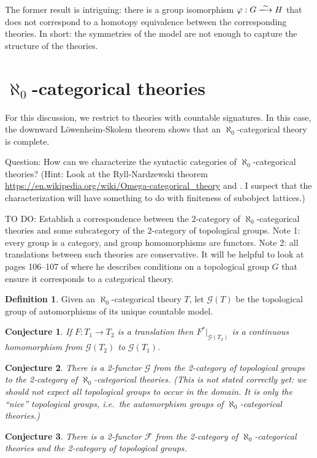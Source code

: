 \documentclass[12pt]{article}
\newtheorem*{conj}{Conjecture}
\theoremstyle{definition}
\newtheorem*{defn}{Definition}
\newcommand{\3}{\mathcal}
\begin{document}
The former result is intriguing: there is a group isomorphism
$\varphi :G\xlongrightarrow{\sim} H$ that does not correspond to a
homotopy equivalence between the corresponding theories. In short: the
symmetries of the model are not enough to capture the structure of the
theories.

\section{$\aleph _0$-categorical theories}

For this discussion, we restrict to theories with countable
signatures. In this case, the downward L{\"o}wenheim-Skolem theorem
shows that an $\aleph _0$-categorical theory is complete.

Question: How can we characterize the syntactic categories of
$\aleph _0$-categorical theories? (Hint: Look at the Ryll-Nardzewski
theorem \url{https://en.wikipedia.org/wiki/Omega-categorical_theory}
and \citep[p 30]{cameron1990}. I suspect that the characterization
will have something to do with finiteness of subobject lattices.)

TO DO: Establish a correspondence between the $2$-category of
$\aleph _0$-categorical theories and some subcategory of the
$2$-category of topological groups. Note 1: every group is a category,
and group homomorphisms are functors.  Note 2: all translations
between such theories are conservative. It will be helpful to look at
pages 106--107 of \citep{cameron1990} where he describes conditions on
a topological group $G$ that ensure it corresponds to a categorical
theory.



\begin{defn} Given an $\aleph _0$-categorical theory $T$, let
  $\3G (T)$ be the topological group of automorphisms of its unique
  countable model. \end{defn}

\begin{conj} If $F:T_1\to T_2$ is a translation then
  $F^*|_{\3G (T_2)}$ is a continuous homomorphism from $\3G (T_2 )$ to
  $\3G (T_1)$. \end{conj}

\begin{conj} There is a 2-functor $\3G$ from the 2-category of
  topological groups to the 2-category of $\aleph _0$-categorical
  theories. (This is not stated correctly yet: we should not expect
  all topological groups to occur in the domain. It is only the
  ``nice'' topological groups, i.e.\ the automorphism groups of
  $\aleph _0$-categorical theories.) \end{conj}


\begin{conj} There is a 2-functor $\3F$ from the 2-category of
  $\aleph _0$-categorical theories and the 2-category of topological
  groups. \end{conj}







\printbibliography 
\end{document}
